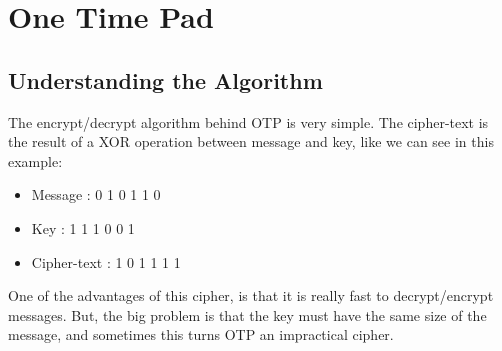 \documentclass[journal]{IEEEtran}
\begin{document}
%



\section{One Time Pad}

\subsection{Understanding the Algorithm}
The encrypt/decrypt algorithm behind OTP is very simple. The cipher-text is the result of a XOR operation between message and key, like we can see in this example:

\begin{itemize}
	\item Message     : 0 1 0 1 1 0
	\item Key         : 1 1 1 0 0 1
	\item Cipher-text : 1 0 1 1 1 1
\end{itemize}

One of the advantages of this cipher, is that it is really fast to decrypt/encrypt messages. But, the big problem is that the key must have the same size of the message, and sometimes this turns OTP an impractical cipher.
\end{document}
